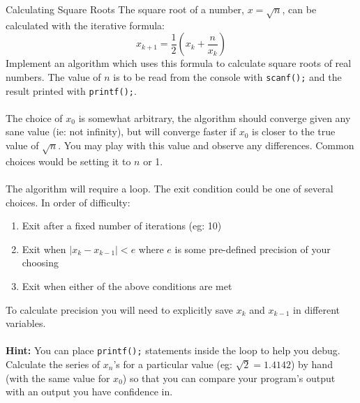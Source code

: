 \documentclass{lab}
\begin{document}
\begin{task}{Calculating Square Roots}{}
The square root of a number, $x = \sqrt{n}$, can be calculated with the iterative formula:
\begin{equation}\label{eq:sqrt}
x_{k+1} = \frac{1}{2}\left(x_k + \frac{n}{x_k}\right)
\end{equation}
Implement an algorithm which uses this formula to calculate square roots of real numbers. The value of $n$ is to be read from the console with \texttt{scanf();} and the result printed with \texttt{printf();}.
\\ \\
The choice of $x_0$ is somewhat arbitrary, the algorithm should converge given any sane value (ie: not infinity), but will converge faster if $x_0$ is closer to the true value of $\sqrt{n}$. You may play with this value and observe any differences. Common choices would be setting it to $n$ or 1.
\\ \\
The algorithm will require a loop. The exit condition could be one of several choices. In order of difficulty:
\begin{enumerate}
\item Exit after a fixed number of iterations (eg: 10)
\item Exit when $\left| x_k - x_{k-1} \right| < e$ where $e$ is some pre-defined precision of your choosing
\item Exit when either of the above conditions are met
\end{enumerate}

To calculate precision you will need to explicitly save $x_k$ and $x_{k-1}$ in different variables.
\\ \\
\textbf{Hint:} You can place \texttt{printf();} statements inside the loop to help you debug. Calculate the series of $x_n$'s for a particular value (eg: $\sqrt{2}=1.4142$) by hand (with the same value for $x_0$) so that you can compare your program's output with an output you have confidence in.
\end{task}\label{tsk:sqrt}
\end{document}
